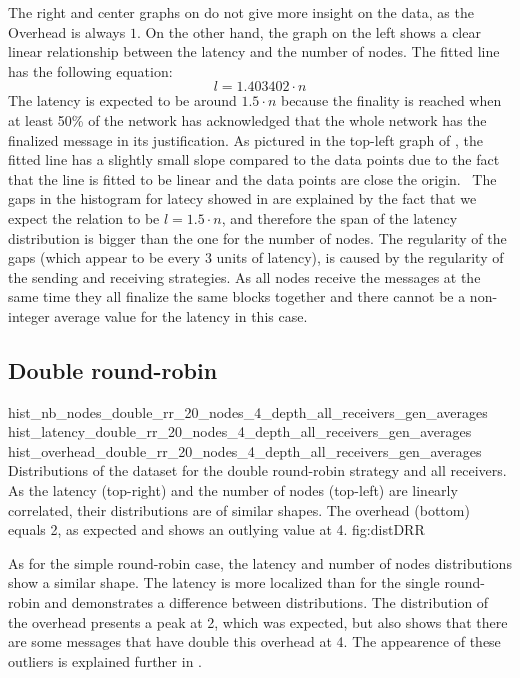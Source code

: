 The right and center graphs on  do not give more insight on the
data, as the Overhead is always \(1\). On the other hand, the graph on the left
shows a clear linear relationship between the latency and the number of nodes.
The fitted line has the following equation:
\[l = 1.403402\cdot n\]
The latency is expected to be around \(1.5\cdot n\) because the finality is
reached when at least 50\% of the network has acknowledged that the whole
network has the finalized message in its justification. As pictured in the
top-left graph of , the fitted line has a slightly small
slope compared to the data points due to the fact that the line is fitted to be
linear and the data points are close the origin. \
The gaps in the histogram for latecy showed in  are explained by the fact
that we expect the relation to be \(l = 1.5\cdot n\), and therefore the span of
the latency distribution is bigger than the one for the number of nodes. The
regularity of the gaps (which appear to be every 3 units of latency), is caused
by the regularity of the sending and receiving strategies. As all nodes receive
the messages at the same time they all finalize the same blocks together and
there cannot be a non-integer average value for the latency in this case.

\FloatBarrier
\subsection{Double round-robin}
\label{ssec:doubleRR}
\triplefigure
    {hist_nb_nodes_double_rr_20_nodes_4_depth_all_receivers_gen_averages}
    {hist_latency_double_rr_20_nodes_4_depth_all_receivers_gen_averages}
    {hist_overhead_double_rr_20_nodes_4_depth_all_receivers_gen_averages}
    {Distributions of the dataset for the double round-robin strategy and all
    receivers. As the latency (top-right) and the number of nodes (top-left) are
    linearly correlated, their distributions are of similar shapes. The
    overhead (bottom) equals 2, as expected and shows an outlying value at 4.}
    {fig:distDRR}

As for the simple round-robin case, the latency and number of nodes
distributions show a similar shape. The latency is more localized than for the
single round-robin and demonstrates a difference between distributions. The
distribution of the overhead presents a peak at 2, which was expected, but also
shows that there are some messages that have double this overhead at 4. The
appearence of these outliers is explained further in \ssec{ssec:arbitrary}. 

